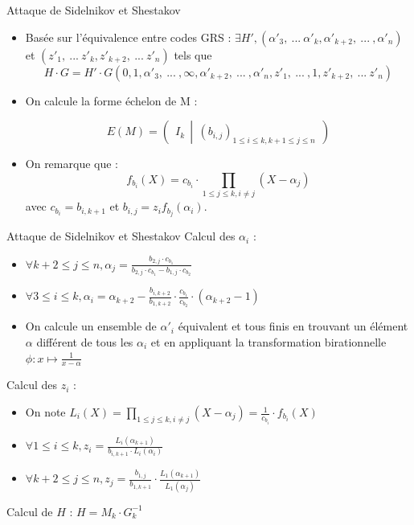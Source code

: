 \documentclass[]{beamer}
\begin{document}
\begin{frame}{Attaque de Sidelnikov et Shestakov}
\begin{itemize}
 \item Basée sur l'équivalence entre codes GRS : $\exists H',(\alpha'_3, \ ... \ \alpha'_{k}, \alpha'_{k+2},\ ... \ , \alpha'_n)$ et $(z'_1, \ ... \ z'_{k},z'_{k+2}, \ ... \ z'_n)$ tels que
 $$H\cdot G=H'\cdot G(0,1,\alpha'_3, \ ... \ ,\infty ,\alpha'_{k+2},\ ... \ , \alpha'_n,z'_1, \ ... \ ,1,z'_{k+2}, \ ... \ z'_n)$$
 \item On calcule la forme échelon de M :

$$ E(M) = 
\left( \ \ I_k \ \ \left| \ \ \left( b_{i,j}\right)_{1\leq i\leq k, k+1 \leq j \leq n} \ \
\right. \right)
$$
 \item On remarque que :
 $$f_{b_i}(X) = c_{b_i}\cdot \prod_{1\leq j\leq k, i\neq j} (X-\alpha_j)$$ avec $c_{b_i}=b_{i,k+1}$ et $b_{i,j}=z_if_{b_j}(\alpha_i)$.
\end{itemize}

\end{frame}

\begin{frame}{Attaque de Sidelnikov et Shestakov}
Calcul des $\alpha_i$ :
\begin{itemize}
 \item $\forall k+2\leq j\leq n, \alpha_j = \frac{b_{2,j}\cdot c_{b_1}}{b_{2,j}\cdot c_{b_1} - b_{1,j}\cdot c_{b_2}}$
 \item $\forall 3\leq i\leq k, \alpha_i = \alpha_{k+2} - \frac{b_{i,k+2}}{b_{1,k+2}}\cdot \frac{c_{b_1}}{c_{b_2}}\cdot (\alpha_{k+2}-1)$
 \item On calcule un ensemble de $\alpha'_i$ équivalent et tous finis en trouvant un élément $\alpha$ différent de tous les $\alpha_i$ et en appliquant la transformation birationnelle $ \phi : x \mapsto \frac{1}{x - \alpha}$
\end{itemize}
Calcul des $z_i$ :
\begin{itemize}
 \item On note $L_i(X) = \prod_{1\leq j\leq k, i\neq j} (X-\alpha_j) = \frac{1}{c_{b_i}}\cdot f_{b_i}(X)$
 \item $\forall 1\leq i\leq k, z_i = \frac{L_i(\alpha_{k+1})}{b_{i,k+1}\cdot L_i(\alpha_i)}$
 \item $\forall k+2\leq j\leq n, z_j = \frac{b_{1,j}}{b_{1,k+1}} \cdot \frac{L_1(\alpha_{k+1})}{L_1(\alpha_j)}$
\end{itemize}
Calcul de $H$ : $H = M_{k}\cdot G_{k}^{-1}$
\end{frame}
\end{document}
